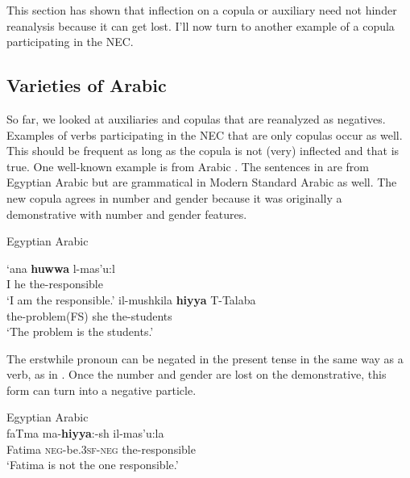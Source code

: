 ﻿\documentclass[output=paper]{langsci/langscibook}
\begin{document}
This section has shown that inflection on a copula or auxiliary need not hinder reanalysis because it can get lost. I'll now turn to another example of a copula participating in the NEC.

\subsection{Varieties of Arabic}\label{sec:oth-2.3}

So far, we looked at auxiliaries and copulas that are reanalyzed as
negatives. Examples of verbs participating in the NEC that are only copulas
occur as well. This should be frequent as long as the copula is not (very)
inflected and that is true. One well-known example is from Arabic
\parencites{Eid1983}{Katz1996}{Edwards2006}{Alsaeedi2015}. The sentences in
 are from Egyptian Arabic but are
grammatical in Modern Standard Arabic as well. The new copula agrees in
number and gender because it was originally a demonstrative with number and
gender features.
%
\begin{exe}\ex Egyptian Arabic
\label{ex:other-arabic-responsible-students}
    \begin{xlist}
    \ex \label{ex:other-arabic-responsible}
    \gll `ana \textbf{huwwa}    l-mas'u:l       \\
    I  he    the-responsible \\
    \glt `I am the responsible.' \citep[51]{Edwards2006}
    \ex \label{ex:other-arabic-students}
    \gll il-mushkila     \textbf{hiyya}   T-Talaba\\    
    the-problem(FS)   she  the-students \\
    \glt `The problem is the students.' \citep[52]{Edwards2006}
    \end{xlist}\end{exe}
%
The erstwhile pronoun can be negated in the present tense in the same way
as a verb, as in . Once the number and gender are lost on the demonstrative, this form can turn into a negative particle.
%
\begin{exe}\ex Egyptian Arabic \label{ex:other-arabic-Fatima}\\
    \gll faTma ma-\textbf{hiyya}:-sh il-mas'u:la \\
    Fatima \textsc{neg}-be.\textsc{3sf-neg}   the-responsible \\
    \glt `Fatima is not the one responsible.' \citep[53]{Edwards2006}
    \end{exe}
\end{document}
